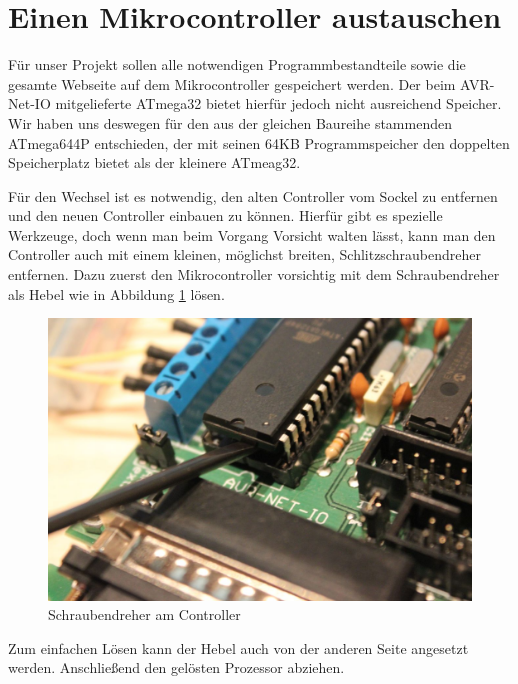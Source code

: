 \section{Einen Mikrocontroller austauschen}
Für unser Projekt sollen alle notwendigen Programmbestandteile sowie die gesamte
Webseite auf dem Mikrocontroller gespeichert werden. Der beim AVR-Net-IO
mitgelieferte ATmega32 bietet hierfür jedoch nicht ausreichend Speicher.
Wir haben uns deswegen für den aus der gleichen Baureihe stammenden ATmega644P
entschieden, der mit seinen 64KB Programmspeicher den doppelten Speicherplatz
bietet als der kleinere ATmeag32.

Für den Wechsel ist es notwendig, den alten Controller vom Sockel zu entfernen
und den neuen Controller einbauen zu können. Hierfür gibt es spezielle
Werkzeuge, doch wenn man beim Vorgang Vorsicht walten lässt, kann man den
Controller auch mit einem kleinen, möglichst breiten, Schlitzschraubendreher
entfernen. Dazu zuerst den Mikrocontroller vorsichtig mit dem Schraubendreher
als Hebel wie in Abbildung \ref{ausbau1} lösen.

\begin{figure}[H]
\centering
\includegraphics[width=13cm]{content/pictures/Anleitung/tauscheProzessor/1_Hebel.jpg}
\caption{Schraubendreher am Controller}
\label{ausbau1}
\end{figure}

Zum einfachen Lösen kann der Hebel auch von der anderen Seite angesetzt
werden. Anschließend den gelösten Prozessor abziehen.


